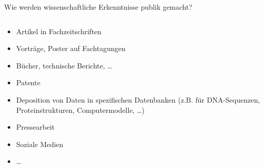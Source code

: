 \documentclass{beamer}
\begin{document}
\begin{frame}{Wie werden wissenschaftliche Erkenntnisse publik gemacht?}
\begin{columns}[c]
\begin{column}{7cm}
\begin{itemize}
            \item 
            Artikel in Fachzeitschriften
                    \item 
            Vorträge, Poster auf Fachtagungen
            \item 
            Bücher, technische Berichte, \dots 
            \item 
            Patente
            \item
            Deposition von Daten in spezifischen Datenbanken (z.B. für DNA-Sequenzen, Proteinstrukturen, Computermodelle, \dots)
            \item 
            Pressearbeit
            \item 
            Soziale Medien
            \item 
            \dots
        \end{itemize}
    \end{column}

\end{columns}
    
\end{frame}
\end{document}
